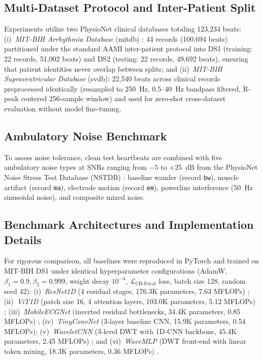 \documentclass[conference]{IEEEtran}
\begin{document}
\subsection{Multi-Dataset Protocol and Inter-Patient Split}
Experiments utilize two PhysioNet clinical databases totaling 123,234 beats:
(i)~\emph{MIT-BIH Arrhythmia Database} (mitdb) \cite{moody2001impact}: 44 records (100,694 beats) partitioned under the standard AAMI inter-patient protocol \cite{de2004automatic} into DS1 (training: 22 records, 51,002 beats) and DS2 (testing: 22 records, 49,692 beats), ensuring that patient identities never overlap between splits; and
(ii)~\emph{MIT-BIH Supraventricular Database} (svdb): 22,540 beats across clinical records preprocessed identically (resampled to 250~Hz, 0.5--40~Hz bandpass filtered, R-peak centered 256-sample window) and used for zero-shot cross-dataset evaluation without model fine-tuning.

\subsection{Ambulatory Noise Benchmark}
To assess noise tolerance, clean test heartbeats are combined with five ambulatory noise types at SNRs ranging from $-5$ to $+25$~dB from the PhysioNet Noise Stress Test Database (NSTDB) \cite{moody1984noise}: baseline wander (record \texttt{bw}), muscle artifact (record \texttt{ma}), electrode motion (record \texttt{em}), powerline interference (50~Hz sinusoidal noise), and composite mixed noise.

\subsection{Benchmark Architectures and Implementation Details}
For rigorous comparison, all baselines were reproduced in PyTorch and trained on MIT-BIH DS1 under identical hyperparameter configurations (AdamW, $\beta_1=0.9, \beta_2=0.999$, weight decay $10^{-4}$, $\mathcal{L}_{\text{CB-Focal}}$ loss, batch size 128, random seed 42): (i)~\emph{ResNet1D} (4 residual stages, 176.3K parameters, 7.63 MFLOPs) \cite{he2016deep, kiranyaz2016real}; (ii)~\emph{ViT1D} (patch size 16, 4 attention layers, 103.0K parameters, 5.12 MFLOPs) \cite{vaswani2017attention}; (iii)~\emph{MobileECGNet} (inverted residual bottlenecks, 34.4K parameters, 0.85 MFLOPs) \cite{sandler2018mobilenetv2}; (iv)~\emph{TinyConvNet} (3-layer baseline CNN, 15.9K parameters, 0.54 MFLOPs); (v)~\emph{WaveletCNN} (3-level DWT with 1D-CNN backbone, 45.4K parameters, 2.45 MFLOPs) \cite{addison2005wavelets}; and (vi)~\emph{WaveMLP} (DWT front-end with linear token mixing, 18.3K parameters, 0.36 MFLOPs) \cite{addison2005wavelets}.
\end{document}
